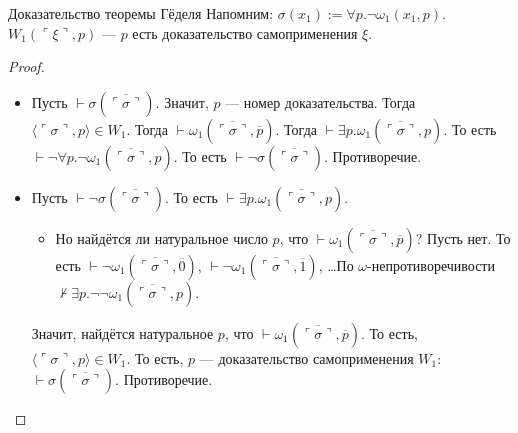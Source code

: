 \documentclass[aspectratio=169]{beamer}
\begin{document}
\begin{frame}{Доказательство теоремы Гёделя}
Напомним: $\sigma(x_1) := \forall p.\neg\omega_1(x_1,p)$. $W_1(\ulcorner\xi\urcorner,p)$ --- $p$ есть доказательство самоприменения $\xi$.
\begin{proof}
\begin{itemize}
\item Пусть $\vdash\sigma(\overline{\ulcorner\sigma\urcorner})$. Значит, $p$ --- номер доказательства. \pause Тогда
$\langle\ulcorner\sigma\urcorner,p\rangle \in W_1$. \pause Тогда $\vdash\omega_1(\overline{\ulcorner\sigma\urcorner},\overline{p})$. \pause 
Тогда $\vdash\exists p.\omega_1(\overline{\ulcorner\sigma\urcorner},p)$. \pause То есть
$\vdash\neg\forall p.\neg\omega_1(\overline{\ulcorner\sigma\urcorner},p)$. \pause То есть $\vdash\neg\sigma(\overline{\ulcorner\sigma\urcorner})$. Противоречие.
\pause
\item Пусть $\vdash\neg\sigma(\overline{\ulcorner\sigma\urcorner})$. \pause То есть $\vdash\exists p.\omega_1(\overline{\ulcorner\sigma\urcorner},p)$.
\begin{itemize}
\item
\pause Но найдётся ли натуральное число $p$, что $\vdash\omega_1(\overline{\ulcorner\sigma\urcorner},\overline{p})$?
\pause Пусть нет. То есть $\vdash\neg\omega_1(\overline{\ulcorner\sigma\urcorner},\overline{0})$,
                          $\vdash\neg\omega_1(\overline{\ulcorner\sigma\urcorner},\overline{1})$, 
                          \dots \pause По $\omega$-непротиворечивости $\not\vdash\exists p.\neg\neg\omega_1(\overline{\ulcorner\sigma\urcorner},p)$. \pause
\end{itemize}
       Значит, найдётся натуральное $p$, что $\vdash\omega_1(\overline{\ulcorner\sigma\urcorner},\overline{p})$. \pause 
То есть, $\langle\ulcorner\sigma\urcorner, p\rangle\in W_1$. \pause
То есть, $p$ --- доказательство самоприменения $W_1$: $\vdash\sigma(\overline{\ulcorner\sigma\urcorner})$. \pause Противоречие.
\end{itemize}
\end{proof}
\end{frame}
\end{document}
